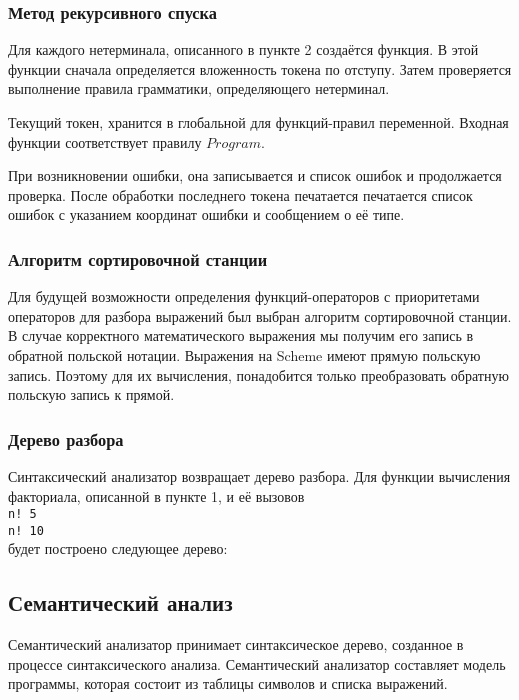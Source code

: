         \subsubsection{Метод рекурсивного спуска}
        Для каждого нетерминала, описанного в пункте 2 создаётся функция.
        В этой функции сначала определяется вложенность токена по отступу.
        Затем проверяется выполнение правила грамматики, определяющего нетерминал\cite{skor}.

        Текущий токен, хранится в глобальной для функций-правил переменной.
        Входная функции соответствует правилу $Program$.

        При возникновении ошибки, она записывается и список ошибок и продолжается проверка.
        После обработки последнего токена печатается печатается список ошибок с указанием координат ошибки и сообщением о её типе.

        \subsubsection{Алгоритм сортировочной станции}
        Для будущей возможности определения функций-операторов с приоритетами операторов для разбора выражений был выбран алгоритм сортировочной станции.
        В случае корректного математического выражения мы получим его запись в обратной польской нотации.
        Выражения на Scheme имеют прямую польскую запись.
        Поэтому для их вычисления, понадобится только преобразовать обратную польскую запись к прямой.

    \subsubsection{Дерево разбора}
    Синтаксический анализатор возвращает дерево разбора.
    Для функции вычисления факториала, описанной в пункте 1, и её вызовов 
    \\ \verb,n! 5,
    \\ \verb,n! 10,
    \\ будет построено следующее дерево:

    
    \subsection{Семантический анализ}
    Семантический анализатор принимает синтаксическое дерево, созданное в процессе синтаксического анализа.
    Семантический анализатор составляет модель программы, которая состоит из таблицы символов и списка выражений.

